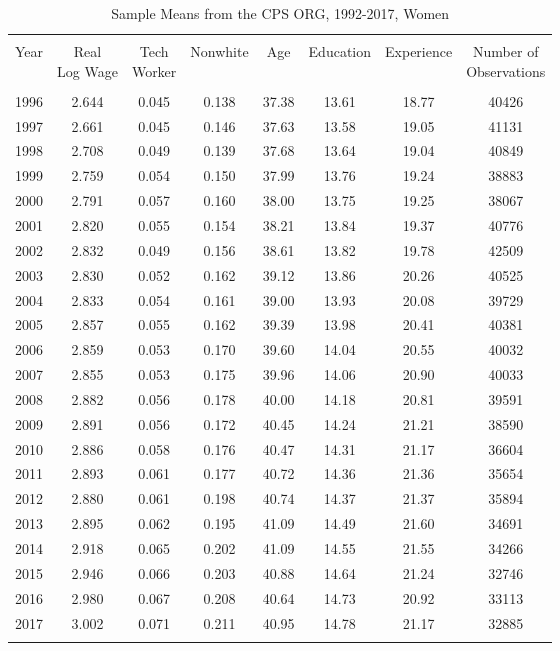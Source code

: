 
\begin{table}[!htbp] \centering 
  \caption{Sample Means from the CPS ORG, 1992-2017, Women} 
  \label{tab:tab_org_summary_women} 
\begin{tabular}{@{\extracolsep{5pt}} cccccccc} 
\\[-1.8ex]\hline 
\hline \\[-1.8ex] 
Year & \thead{Real \\ Log Wage} & \thead{Tech \\ Worker} & Nonwhite & Age & Education & Experience & \thead{Number of \\ Observations} \\ 
\hline \\[-1.8ex] 
1996 & 2.644 & 0.045 & 0.138 & 37.38 & 13.61 & 18.77 & 40426 \\ 
1997 & 2.661 & 0.045 & 0.146 & 37.63 & 13.58 & 19.05 & 41131 \\ 
1998 & 2.708 & 0.049 & 0.139 & 37.68 & 13.64 & 19.04 & 40849 \\ 
1999 & 2.759 & 0.054 & 0.150 & 37.99 & 13.76 & 19.24 & 38883 \\ 
2000 & 2.791 & 0.057 & 0.160 & 38.00 & 13.75 & 19.25 & 38067 \\ 
2001 & 2.820 & 0.055 & 0.154 & 38.21 & 13.84 & 19.37 & 40776 \\ 
2002 & 2.832 & 0.049 & 0.156 & 38.61 & 13.82 & 19.78 & 42509 \\ 
2003 & 2.830 & 0.052 & 0.162 & 39.12 & 13.86 & 20.26 & 40525 \\ 
2004 & 2.833 & 0.054 & 0.161 & 39.00 & 13.93 & 20.08 & 39729 \\ 
2005 & 2.857 & 0.055 & 0.162 & 39.39 & 13.98 & 20.41 & 40381 \\ 
2006 & 2.859 & 0.053 & 0.170 & 39.60 & 14.04 & 20.55 & 40032 \\ 
2007 & 2.855 & 0.053 & 0.175 & 39.96 & 14.06 & 20.90 & 40033 \\ 
2008 & 2.882 & 0.056 & 0.178 & 40.00 & 14.18 & 20.81 & 39591 \\ 
2009 & 2.891 & 0.056 & 0.172 & 40.45 & 14.24 & 21.21 & 38590 \\ 
2010 & 2.886 & 0.058 & 0.176 & 40.47 & 14.31 & 21.17 & 36604 \\ 
2011 & 2.893 & 0.061 & 0.177 & 40.72 & 14.36 & 21.36 & 35654 \\ 
2012 & 2.880 & 0.061 & 0.198 & 40.74 & 14.37 & 21.37 & 35894 \\ 
2013 & 2.895 & 0.062 & 0.195 & 41.09 & 14.49 & 21.60 & 34691 \\ 
2014 & 2.918 & 0.065 & 0.202 & 41.09 & 14.55 & 21.55 & 34266 \\ 
2015 & 2.946 & 0.066 & 0.203 & 40.88 & 14.64 & 21.24 & 32746 \\ 
2016 & 2.980 & 0.067 & 0.208 & 40.64 & 14.73 & 20.92 & 33113 \\ 
2017 & 3.002 & 0.071 & 0.211 & 40.95 & 14.78 & 21.17 & 32885 \\ 
\hline \\[-1.8ex] 
\end{tabular} 
\end{table} 
